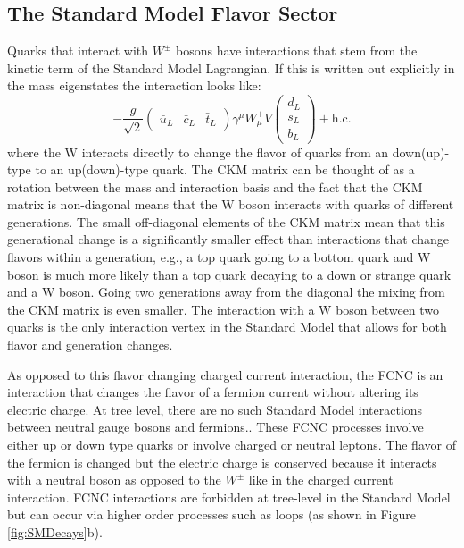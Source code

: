 \subsection{The Standard Model Flavor Sector}
Quarks that interact with $W^\pm$ bosons have interactions that stem from the kinetic term of the Standard Model Lagrangian.  If this is written out explicitly in the mass eigenstates the interaction looks like:
\[ -\frac{g}{\sqrt{2}}\begin{pmatrix} \bar{u}_L & \bar{c}_L &\bar{t}_L \end{pmatrix} \gamma^\mu W_\mu^+ V\begin{pmatrix} d_L\\s_L\\b_L\end{pmatrix}+\text{h.c.}
\]
where the W interacts directly to change the flavor of quarks from an down(up)-type to an up(down)-type quark.  The CKM matrix can be thought of as a rotation between the mass and interaction basis and the fact that the CKM matrix is non-diagonal means that the W boson interacts with quarks of different generations.  The small off-diagonal elements of the CKM matrix mean that this generational change is a significantly smaller effect than interactions that change flavors within a generation, e.g., a top quark going to a bottom quark and W boson is much more likely than a top quark decaying to a down or strange quark and a W boson.  Going two generations away from the diagonal the mixing from the CKM matrix is even smaller.  The interaction with a W boson between two quarks is the only interaction vertex in the Standard Model that allows for both flavor and generation changes.

As opposed to this flavor changing charged current interaction, the FCNC is an interaction that changes the flavor of a fermion current without altering its electric charge.  At tree level, there are no such Standard Model interactions between neutral gauge bosons and fermions..  These FCNC processes involve either up or down type quarks or involve charged or neutral leptons.  The flavor of the fermion is changed but the electric charge is conserved because it interacts with a neutral boson as opposed to the $W^\pm$ like in the charged current interaction.  FCNC interactions are forbidden at tree-level in the Standard Model but can occur via higher order processes such as loops (as shown in Figure \ref{fig:SMDecays}b).

